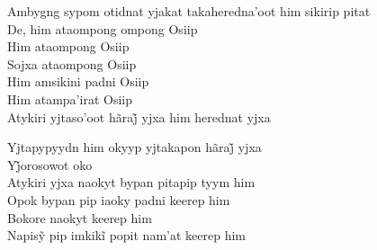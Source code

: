  \smallskip
 \begin{center}\end{center}
 \smallskip
 
\noindent   Ambygng sypom otidnat yjakat takaheredna'oot him sikirip pitat\\
  De, him ataompong ompong Osiip\\
  Him ataompong Osiip\\
  Sojxa ataompong Osiip\\
  Him amsikini padni Osiip\\
  Him atampa'irat Osiip\\
  Atykiri yjtaso’oot hãraj̃ yjxa him herednat yjxa
 
 \smallskip
 \begin{center}\end{center}
 \smallskip
 
\noindent   Yjtapypyydn him okyyp yjtakapon hãraj̃ yjxa\\
  Yj̃orosowot oko\\
  Atykiri yjxa naokyt bypan pitapip tyym him\\
  Opok bypan pip iaoky padni keerep him\\
  Bokore naokyt keerep him\\
  Napisỹ pip imkikĩ popit nam’at keerep him
 
 \smallskip
 \begin{center}\end{center}
 \smallskip
 
